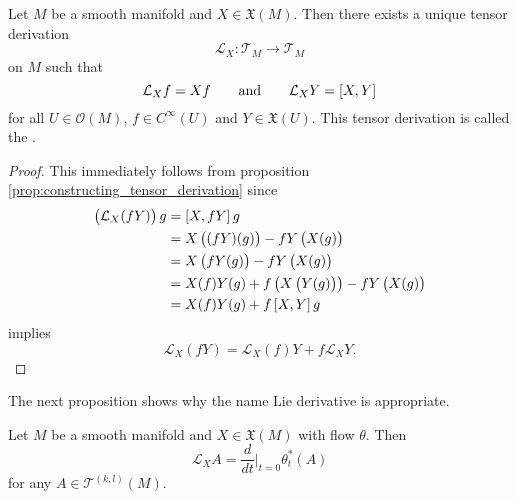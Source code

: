 \begin{theorem}
	Let $M$ be a smooth manifold and $X \in \mathfrak{X}(M)$. Then there exists a unique tensor derivation 
	\begin{equation*}
		\mathcal{L}_X : \mathcal{T}_M \to \mathcal{T}_M
	\end{equation*}
	\noindent on $M$ such that
	\begin{equation*}
		\mathcal{L}_Xf = Xf \qquad \text{and} \qquad \mathcal{L}_XY = \sbr[0]{X,Y}
	\end{equation*}
	\noindent for all $U \in \mathcal{O}(M)$, $f \in C^\infty(U)$ and $Y \in \mathfrak{X}(U)$. This tensor derivation is called the .
\end{theorem}

\begin{proof}
	This immediately follows from proposition \ref{prop:constructing_tensor_derivation} since
	\begin{align*}
		\del[1]{\mathcal{L}_X(fY)}g &= \sbr[0]{X,fY}g\\
		&= X\del[1]{(fY)(g)} - fY\del[1]{X(g)}\\
		&= X\del[1]{fY(g)} - fY\del[1]{X(g)}\\
		&= X(f)Y(g) + f \del[1]{X\del[1]{Y(g)}} -  fY\del[1]{X(g)}\\
		&= X(f)Y(g) + f \sbr[0]{X,Y}g
	\end{align*}
	\noindent implies
	\begin{equation*}
		\mathcal{L}_X(fY) = \mathcal{L}_X(f)Y + f\mathcal{L}_XY.
	\end{equation*}
\end{proof}

The next proposition shows why the name Lie derivative is appropriate.

\begin{proposition}
	Let $M$ be a smooth manifold and $X \in \mathfrak{X}(M)$ with flow $\theta$. Then
	\begin{equation*}
		\mathcal{L}_XA = \frac{d}{dt}\bigg\vert_{t = 0} \theta_t^*(A)
	\end{equation*}
	\noindent for any $A \in \mathcal{T}^{(k,l)}(M)$.
\end{proposition}
